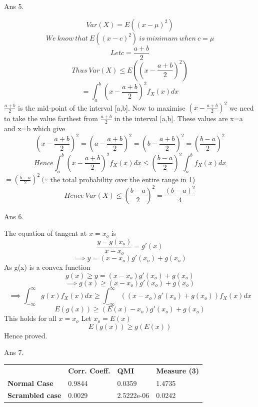 \documentclass[11pt]{article}
\begin{document}
Ans 5.\begin{center}
$$Var(X) = E((x-\mu)^2)$$
$$We\ know\ that\ E((x-c)^2)\ is\ minimum\ when\ c = \mu$$
$$Let c = \frac{a+b}{2}$$
$$Thus\ Var(X) \le E((x-\frac{a+b}{2})^2)$$
$$=\int_{a}^{b}(x - \frac{a+b}{2})^2 f_X(x) dx$$
$\frac{a+b}{2}$ is the mid-point of the interval [a,b].
Now to maximise $(x - \frac{a+b}{2})^2$ we need to take the value farthest from $\frac{a+b}{2}$ in the interval [a,b]. These values are x=a and x=b which give
$$(x - \frac{a+b}{2})^2 = (a - \frac{a+b}{2})^2 = (b - \frac{a+b}{2})^2 = (\frac{b-a}{2})^2$$
$$Hence \int_{a}^{b}(x - \frac{a+b}{2})^2 f_X(x) dx \le (\frac{b-a}{2})^2 \int_{a}^{b} f_X(x) dx$$
$=(\frac{b-a}{2})^2\ (\because$ the total probability over the entire range in 1)
$$Hence\ Var(X) \le (\frac{b-a}{2})^2=\frac{(b-a)^2}{4}$$
\newline
\newline
\end{center}

Ans 6.\begin{center}
The equation of tangent at $x=x_o$ is
$$\frac{y-g(x_o)}{x-x_o} = g'(x)$$
$$\implies y=(x-x_o)g'(x_o)+g(x_o)$$
As g(x) is a convex function
$$g(x) \ge y=(x-x_o)g'(x_o)+g(x_o)$$
$$\implies g(x) \ge (x-x_o)g'(x_o) + g(x_o)$$
$$\implies \int_{-\infty}^{\infty}g(x)f_X(x)dx \ge \int_{-\infty}^{\infty}((x-x_o)g'(x_o) + g(x_o))f_X(x)dx$$
$$E(g(x)) \ge (E(x) - x_o)g'(x_o) + g(x_o)$$
This holds for all $x=x_o$
Let $x_o=E(x)$
$$E(g(x)) \ge g(E(x))$$
Hence proved.
\newline
\newline
\end{center}
\pagebreak

Ans 7.\begin{center}
\begin{table}[h]
\centering
\begin{tabular}{llll}
                        & \textbf{Corr. Coeff.} & \textbf{QMI} & \textbf{Measure (3)} \\
\textbf{Normal Case}    & 0.9844                      & 0.0359       & 1.4735               \\
\textbf{Scrambled case} & 0.0029                      & 2.5222e-06   & 0.0242              
\end{tabular}
\end{table}
\end{center}
\end{document}
